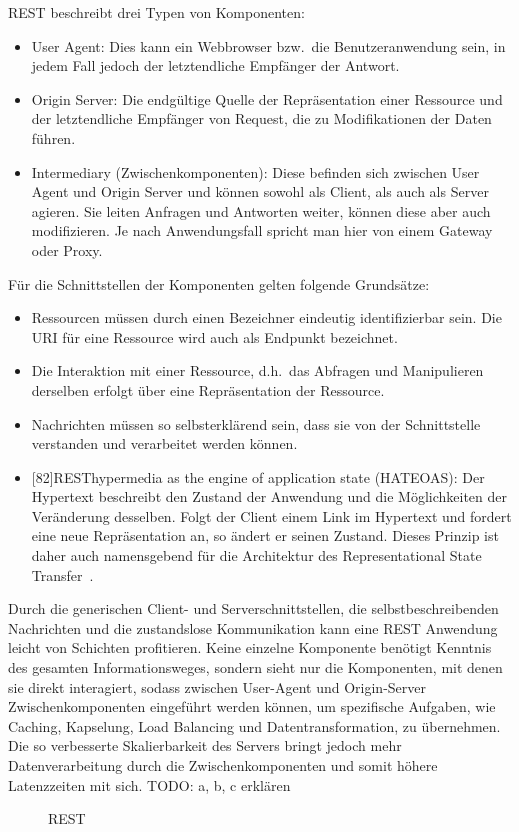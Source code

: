 REST beschreibt drei Typen von Komponenten:\cite[vgl.][96]{REST}
\begin{itemize}
  \item User Agent:
  Dies kann ein Webbrowser bzw.\ die Benutzeranwendung sein, in jedem Fall jedoch der letztendliche Empfänger der Antwort.
  \item Origin Server:
  Die endgültige Quelle der Repräsentation einer Ressource und der letztendliche Empfänger von Request, die zu Modifikationen der Daten führen.
  \item Intermediary (Zwischenkomponenten):
  Diese befinden sich zwischen User Agent und Origin Server und können sowohl als Client, als auch als Server agieren. Sie leiten Anfragen und Antworten weiter, können diese aber auch modifizieren. Je nach Anwendungsfall spricht man hier von einem Gateway oder Proxy.
\end{itemize}
Für die Schnittstellen der Komponenten gelten folgende Grundsätze:\cite[vgl.][82]{REST}
\begin{itemize}
  \item Ressourcen müssen durch einen Bezeichner eindeutig identifizierbar sein.
  Die URI für eine Ressource wird auch als Endpunkt bezeichnet.
  \item Die Interaktion mit einer Ressource, d.h.\ das Abfragen und Manipulieren derselben erfolgt über eine Repräsentation der Ressource.
  \item Nachrichten müssen so selbsterklärend sein, dass sie von der Schnittstelle verstanden und verarbeitet werden können.
  \item {}[82]{REST}{hypermedia as the engine of application state} (HATEOAS): Der Hypertext beschreibt den Zustand der Anwendung und die Möglichkeiten der Veränderung desselben.
  Folgt der Client einem Link im Hypertext und fordert eine neue Repräsentation an, so ändert er seinen Zustand.
  Dieses Prinzip ist daher auch namensgebend für die Architektur des Representational State Transfer~\cite[vgl.][103f.]{SOA}.
\end{itemize}
\par
Durch die generischen Client- und Serverschnittstellen, die selbstbeschreibenden Nachrichten und die zustandslose Kommunikation kann eine REST Anwendung leicht von Schichten profitieren.
Keine einzelne Komponente benötigt Kenntnis des gesamten Informationsweges, sondern sieht nur die Komponenten, mit denen sie direkt interagiert, sodass zwischen
User-Agent und Origin-Server Zwischenkomponenten eingeführt werden können, um spezifische Aufgaben, wie Caching, Kapselung, Load Balancing und Datentransformation, zu übernehmen.\cite[vgl.][99]{REST}
Die so verbesserte Skalierbarkeit des Servers bringt jedoch mehr Datenverarbeitung durch die Zwischenkomponenten und somit höhere Latenzzeiten mit sich.\cite[vgl.][83,98]{REST}
TODO: a, b, c erklären
\begin{figure}[h]
  \centering
  \caption{REST~\cite[84]{REST}}\label{img:REST-diss}
\end{figure}

